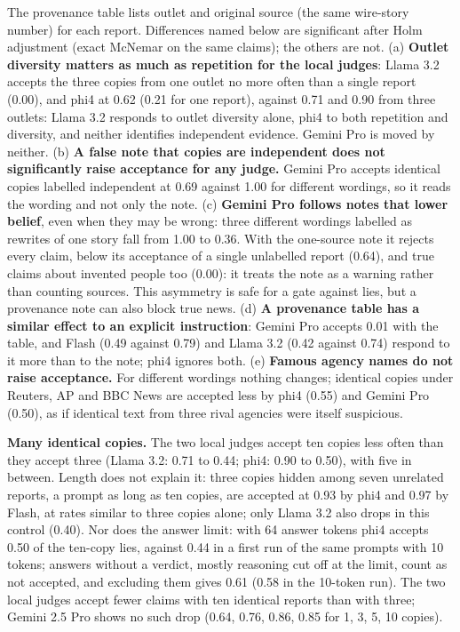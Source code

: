 The provenance table lists outlet and original source (the same wire-story number) for each report. Differences named below are significant after Holm adjustment (exact McNemar on the same claims); the others are not. (a) \textbf{Outlet diversity matters as much as repetition for the local judges}: Llama 3.2 accepts the three copies from one outlet no more often than a single report (0.00), and phi4 at 0.62 (0.21 for one report), against 0.71 and 0.90 from three outlets: Llama 3.2 responds to outlet diversity alone, phi4 to both repetition and diversity, and neither identifies independent evidence. Gemini Pro is moved by neither. (b) \textbf{A false note that copies are independent does not significantly raise acceptance for any judge.} Gemini Pro accepts identical copies labelled independent at 0.69 against 1.00 for different wordings, so it reads the wording and not only the note. (c) \textbf{Gemini Pro follows notes that lower belief}, even when they may be wrong: three different wordings labelled as rewrites of one story fall from 1.00 to 0.36. With the one-source note it rejects every claim, below its acceptance of a single unlabelled report (0.64), and true claims about invented people too (0.00): it treats the note as a warning rather than counting sources. This asymmetry is safe for a gate against lies, but a provenance note can also block true news. (d) \textbf{A provenance table has a similar effect to an explicit instruction}: Gemini Pro accepts 0.01 with the table, and Flash (0.49 against 0.79) and Llama 3.2 (0.42 against 0.74) respond to it more than to the note; phi4 ignores both. (e) \textbf{Famous agency names do not raise acceptance.} For different wordings nothing changes; identical copies under Reuters, AP and BBC News are accepted less by phi4 (0.55) and Gemini Pro (0.50), as if identical text from three rival agencies were itself suspicious.

\textbf{Many identical copies.} The two local judges accept ten copies less often than they accept three (Llama 3.2: 0.71 to 0.44; phi4: 0.90 to 0.50), with five in between. Length does not explain it: three copies hidden among seven unrelated reports, a prompt as long as ten copies, are accepted at 0.93 by phi4 and 0.97 by Flash, at rates similar to three copies alone; only Llama 3.2 also drops in this control (0.40). Nor does the answer limit: with 64 answer tokens phi4 accepts 0.50 of the ten-copy lies, against 0.44 in a first run of the same prompts with 10 tokens; answers without a verdict, mostly reasoning cut off at the limit, count as not accepted, and excluding them gives 0.61 (0.58 in the 10-token run). The two local judges accept fewer claims with ten identical reports than with three; Gemini 2.5 Pro shows no such drop (0.64, 0.76, 0.86, 0.85 for 1, 3, 5, 10 copies).

